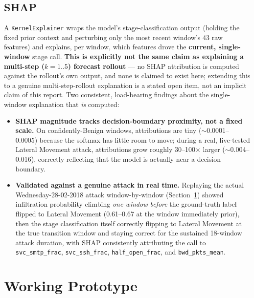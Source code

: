 \documentclass[11pt]{article}
\newcommand{\code}[1]{\texttt{#1}}
\begin{document}
\subsection{SHAP}

A \code{KernelExplainer} wraps the model's stage-classification output (holding the fixed prior
context and perturbing only the most recent window's 43 raw features) and explains, per window,
which features drove the \textbf{current, single-window} stage call. \textbf{This is explicitly
not the same claim as explaining a multi-step ($k{=}1..5$) forecast rollout} --- no SHAP
attribution is computed against the rollout's own output, and none is claimed to exist here;
extending this to a genuine multi-step-rollout explanation is a stated open item, not an
implicit claim of this report. Two consistent, load-bearing findings about the single-window
explanation that \emph{is} computed:

\begin{itemize}[leftmargin=1.5em]
  \item \textbf{SHAP magnitude tracks decision-boundary proximity, not a fixed scale.} On
  confidently-Benign windows, attributions are tiny ($\sim$0.0001--0.0005) because the softmax
  has little room to move; during a real, live-tested Lateral Movement attack, attributions grow
  roughly 30--100$\times$ larger ($\sim$0.004--0.016), correctly reflecting that the model is
  actually near a decision boundary.
  \item \textbf{Validated against a genuine attack in real time.} Replaying the actual
  Wednesday-28-02-2018 attack window-by-window (Section~\ref{sec:demo}) showed infiltration
  probability climbing \emph{one window before} the ground-truth label flipped to Lateral
  Movement (0.61--0.67 at the window immediately prior), then the stage classification itself
  correctly flipping to Lateral Movement at the true transition window and staying correct for
  the sustained 18-window attack duration, with SHAP consistently attributing the call to
  \code{svc\_smtp\_frac}, \code{svc\_ssh\_frac}, \code{half\_open\_frac}, and
  \code{bwd\_pkts\_mean}.
\end{itemize}

\section{Working Prototype}
\label{sec:demo}
\end{document}

